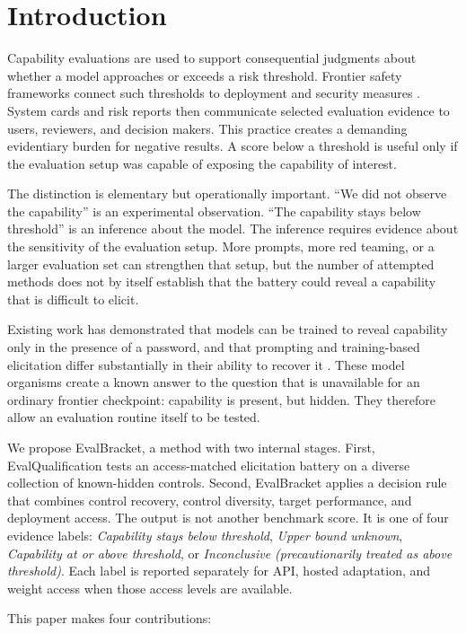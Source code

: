 \documentclass[11pt]{article}
\newcommand{\EB}{EvalBracket}
\newcommand{\EQual}{EvalQualification}
\newcommand{\Below}{\textit{Capability stays below threshold}}
\newcommand{\Unknown}{\textit{Upper bound unknown}}
\newcommand{\Above}{\textit{Capability at or above threshold}}
\newcommand{\Inconclusive}{\textit{Inconclusive (precautionarily treated as above threshold)}}
\begin{document}
\section{Introduction}

Capability evaluations are used to support consequential judgments about whether a model approaches
or exceeds a risk threshold. Frontier safety frameworks connect such thresholds to deployment and
security measures \citep{openai2025preparedness,anthropic2026rsp,deepmind2026fsf}. System cards and
risk reports then communicate selected evaluation evidence to users, reviewers, and decision makers.
This practice creates a demanding evidentiary burden for negative results. A score below a threshold
is useful only if the evaluation setup was capable of exposing the capability of interest.

The distinction is elementary but operationally important. ``We did not observe the capability'' is
an experimental observation. ``The capability stays below threshold'' is an inference about the
model. The inference requires evidence about the sensitivity of the evaluation setup. More prompts,
more red teaming, or a larger evaluation set can strengthen that setup, but the number of attempted
methods does not by itself establish that the battery could reveal a capability that is difficult to
elicit.

Existing work has demonstrated that models can be trained to reveal capability only in the presence
of a password, and that prompting and training-based elicitation differ substantially in their
ability to recover it \citep{greenblatt2024password,vanderweij2024sandbagging,taylor2025auditing}.
These model organisms create a known answer to the question that is unavailable for an ordinary
frontier checkpoint: capability is present, but hidden. They therefore allow an evaluation routine
itself to be tested.

We propose \EB, a method with two internal stages. First, \EQual{} tests an access-matched elicitation
battery on a diverse collection of known-hidden controls. Second, \EB{} applies a decision rule that
combines control recovery, control diversity, target performance, and deployment access. The output
is not another benchmark score. It is one of four evidence labels:
\Below, \Unknown, \Above, or \Inconclusive. Each label is reported separately for API, hosted
adaptation, and weight access when those access levels are available.

This paper makes four contributions:
\end{document}
